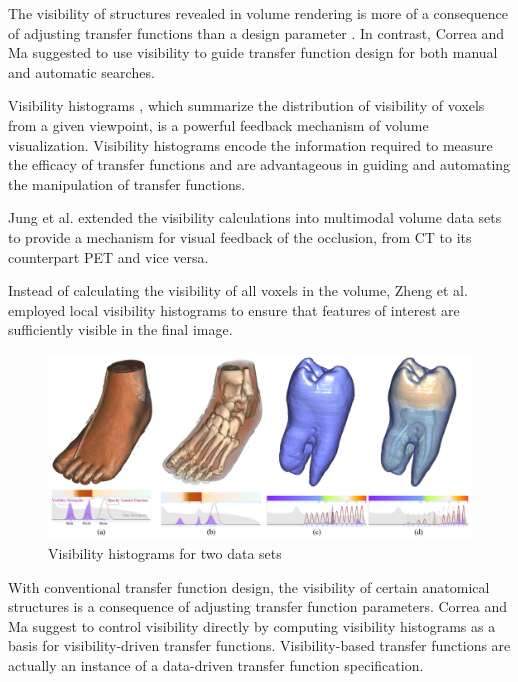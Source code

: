 The visibility of structures revealed in volume rendering is more of a consequence of adjusting transfer functions than a design parameter \cite{preim_visual_2013}. In contrast, Correa and Ma \cite{correa_visibility-driven_2009} suggested to use visibility to guide transfer function design for both manual and automatic searches.

Visibility histograms \cite{emsenhuber_visibility_2008} \cite{correa_visibility-driven_2009}, which summarize the distribution of visibility of voxels from a given viewpoint, is a powerful feedback mechanism of volume visualization.
Visibility histograms encode the information required to measure the efficacy of transfer functions and are advantageous in guiding and automating the manipulation of transfer functions.

Jung et al. \cite{jung_visibility-driven_2013} extended the visibility calculations into multimodal volume data sets to provide a mechanism for visual feedback of the occlusion, from CT to its counterpart PET and vice versa.

Instead of calculating the visibility of all voxels in the volume, Zheng et al. \cite{zheng_visibility_2013} employed local visibility histograms to ensure that features of interest are sufficiently visible in the final image.

\cite{jung_dual-modal_2012}
\cite{schlegel_visibility-difference_2013}

\begin{figure}
\centering
\includegraphics[width=1\linewidth]{images/correa_visibility-driven_2009}
\caption{Visibility histograms for two data sets \cite{correa_visibility-driven_2009}}
\label{fig:correa_visibility-driven_2009}
\end{figure}

With conventional transfer function design, the visibility of certain anatomical structures is a consequence of adjusting transfer function parameters. 
Correa and Ma suggest to control visibility directly by computing visibility histograms as a basis for visibility-driven transfer functions. Visibility-based transfer functions are actually an instance of a data-driven transfer function specification.

